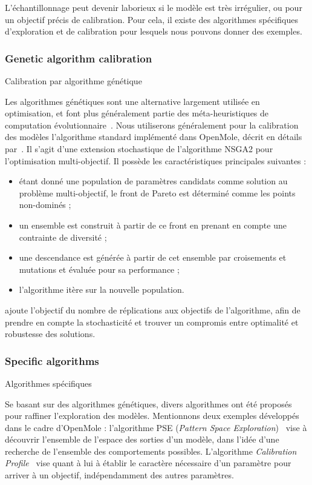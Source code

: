 L'échantillonnage peut devenir laborieux si le modèle est très irrégulier, ou pour un objectif précis de calibration. Pour cela, il existe des algorithmes spécifiques d'exploration et de calibration pour lesquels nous pouvons donner des exemples.

\subsubsection*{Genetic algorithm calibration}{Calibration par algorithme génétique}

Les algorithmes génétiques sont une alternative largement utilisée en optimisation, et font plus généralement partie des méta-heuristiques de computation évolutionnaire~\cite{rey2015plateforme}. Nous utiliserons généralement pour la calibration des modèles l'algorithme standard implémenté dans OpenMole, décrit en détails par~\cite{pumain2017evaluation}. Il s'agit d'une extension stochastique de l'algorithme NSGA2 pour l'optimisation multi-objectif. Il possède les caractéristiques principales suivantes :
\begin{itemize}
	\item étant donné une population de paramètres candidats comme solution au problème multi-objectif, le front de Pareto est déterminé comme les points non-dominés ;
	\item un ensemble est construit à partir de ce front en prenant en compte une contrainte de diversité ;
	\item une descendance est générée à partir de cet ensemble par croisements et mutations et évaluée pour sa performance ;
	\item l'algorithme itère sur la nouvelle population.
\end{itemize}

\cite{pumain2017evaluation} ajoute l'objectif du nombre de réplications aux objectifs de l'algorithme, afin de prendre en compte la stochasticité et trouver un compromis entre optimalité et robustesse des solutions.


\subsubsection*{Specific algorithms}{Algorithmes spécifiques}

Se basant sur des algorithmes génétiques, divers algorithmes ont été proposés pour raffiner l'exploration des modèles. Mentionnons deux exemples développés dans le cadre d'OpenMole : l'algorithme PSE (\emph{Pattern Space Exploration})~\cite{10.1371/journal.pone.0138212} vise à découvrir l'ensemble de l'espace des sorties d'un modèle, dans l'idée d'une recherche de l'ensemble des comportements possibles. L'algorithme \emph{Calibration Profile}~\cite{reuillon2015} vise quant à lui à établir le caractère nécessaire d'un paramètre pour arriver à un objectif, indépendamment des autres paramètres.





\stars






